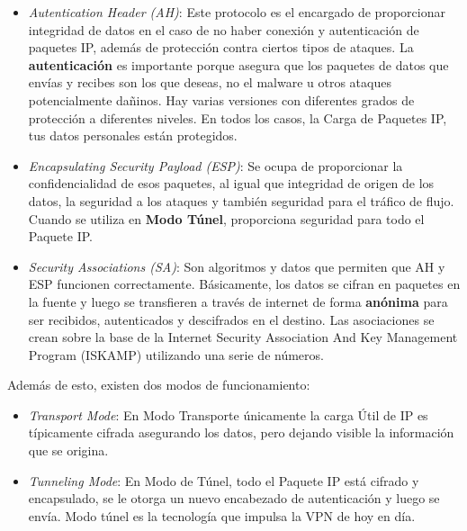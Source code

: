 \begin{itemize}
  \item \textit{Autentication Header (AH)}: Este protocolo es el
    encargado de proporcionar integridad de datos en el caso de no
    haber conexión y autenticación de paquetes IP, además de
    protección contra ciertos tipos de ataques.  La
    \textbf{autenticación} es importante porque asegura que los
    paquetes de datos que envías y recibes son los que deseas, no el
    malware u otros ataques potencialmente dañinos. Hay varias
    versiones con diferentes grados de protección a diferentes
    niveles. En todos los casos, la Carga de Paquetes IP, tus datos
    personales están protegidos.
		
  \item \textit{Encapsulating Security Payload (ESP)}: Se ocupa de
    proporcionar la confidencialidad de esos paquetes, al igual que
    integridad de origen de los datos, la seguridad a los ataques y
    también seguridad para el tráfico de flujo. Cuando se utiliza en
    \textbf{Modo Túnel}, proporciona seguridad para todo el Paquete
    IP.
 	
	\item \textit{Security Associations (SA)}: Son algoritmos y
          datos que permiten que AH y ESP funcionen correctamente.
          Básicamente, los datos se cifran en paquetes en la fuente y
          luego se transfieren a través de internet de forma
          \textbf{anónima} para ser recibidos, autenticados y
          descifrados en el destino. Las asociaciones se crean sobre
          la base de la Internet Security Association And Key
          Management Program (ISKAMP) utilizando una serie de números.
\end{itemize}

Además de esto, existen dos modos de funcionamiento:

\begin{itemize}
  \item \textit{Transport Mode}: En Modo Transporte únicamente la
    carga Útil de IP es típicamente cifrada asegurando los datos, pero
    dejando visible la información que se origina.
	
  \item \textit{Tunneling Mode}: En Modo de Túnel, todo el Paquete IP
    está cifrado y encapsulado, se le otorga un nuevo encabezado de
    autenticación y luego se envía. Modo túnel es la tecnología que
    impulsa la VPN de hoy en día.
\end{itemize}

